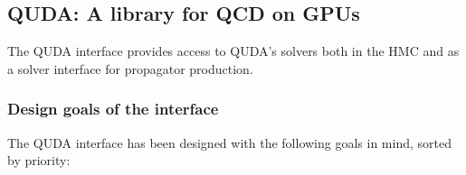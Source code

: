 
\subsection{QUDA: A library for QCD on GPUs}\label{subsec:quda}


The QUDA \cite{Clark:2009wm, Babich:2011np, Strelchenko:2013vaa} interface provides access to QUDA's solvers both in the HMC and as a solver interface for propagator production.

\subsubsection{Design goals of the interface}
The QUDA interface has been designed with the following goals in mind, sorted by priority:
